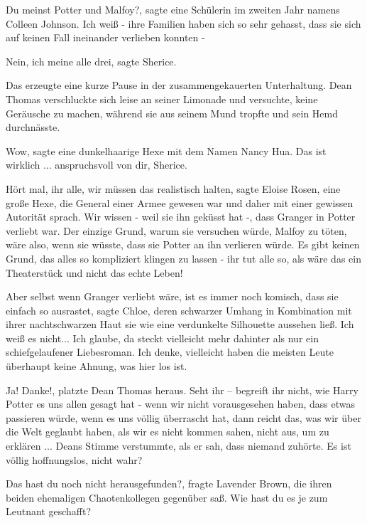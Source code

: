 \glqq{}Du meinst Potter und Malfoy?\grqq{}, sagte eine Schülerin im zweiten Jahr
namens Colleen Johnson. \glqq{}Ich weiß - ihre Familien haben sich so sehr
gehasst, dass sie sich auf keinen Fall ineinander verlieben konnten -\grqq{}

\glqq{}Nein, ich meine alle drei\grqq{}, sagte Sherice.

Das erzeugte eine kurze Pause in der zusammengekauerten Unterhaltung. Dean
Thomas verschluckte sich leise an seiner Limonade und versuchte, keine Geräusche
zu machen, während sie aus seinem Mund tropfte und sein Hemd durchnässte.

\glqq{}Wow\grqq{}, sagte eine dunkelhaarige Hexe mit dem Namen Nancy Hua. \glqq{}
Das ist wirklich ... anspruchsvoll von dir, Sherice.\grqq{}

\glqq{}Hört mal, ihr alle, wir müssen das realistisch halten\grqq{}, sagte Eloise
Rosen, eine große Hexe, die General einer Armee gewesen war und daher mit einer
gewissen Autorität sprach. \glqq{}Wir wissen - weil sie ihn geküsst hat -, dass
Granger in Potter verliebt war. Der einzige Grund, warum sie versuchen würde,
Malfoy zu töten, wäre also, wenn sie wüsste, dass sie Potter an ihn verlieren
würde. Es gibt keinen Grund, das alles so kompliziert klingen zu lassen - ihr
tut alle so, als wäre das ein Theaterstück und nicht das echte Leben!\grqq{}

\glqq{}Aber selbst wenn Granger verliebt wäre, ist es immer noch komisch, dass
sie einfach so ausrastet\grqq{}, sagte Chloe, deren schwarzer Umhang in
Kombination mit ihrer nachtschwarzen Haut sie wie eine verdunkelte Silhouette
aussehen ließ. \glqq{}Ich weiß es nicht... Ich glaube, da steckt vielleicht mehr
dahinter als nur ein schiefgelaufener Liebesroman. Ich denke, vielleicht haben
die meisten Leute überhaupt keine Ahnung, was hier los ist.\grqq{}

\glqq{}Ja! Danke!\grqq{}, platzte Dean Thomas heraus. \glqq{}Seht ihr – begreift
ihr nicht, wie Harry Potter es uns allen gesagt hat - wenn wir nicht
vorausgesehen haben, dass etwas passieren würde, wenn es uns völlig überrascht
hat, dann reicht das, was wir über die Welt geglaubt haben, als wir es nicht
kommen sahen, nicht aus, um zu erklären ...\grqq{} Deans Stimme verstummte, als
er sah, dass niemand zuhörte. \glqq{}Es ist völlig hoffnungslos, nicht
wahr?\grqq{}

\glqq{}Das hast du noch nicht herausgefunden?\grqq{}, fragte Lavender Brown, die
ihren beiden ehemaligen Chaotenkollegen gegenüber saß. \glqq{}Wie hast du es je
zum Leutnant geschafft?\grqq{}

